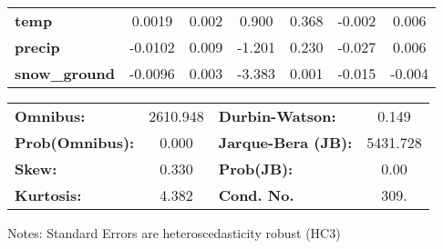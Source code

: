 \begin{center}
\begin{tabular}{lcccccc}
\textbf{temp}          &       0.0019  &        0.002     &     0.900  &         0.368        &       -0.002    &        0.006     \\
\textbf{precip}        &      -0.0102  &        0.009     &    -1.201  &         0.230        &       -0.027    &        0.006     \\
\textbf{snow\_ground}  &      -0.0096  &        0.003     &    -3.383  &         0.001        &       -0.015    &       -0.004     \\
\bottomrule
\end{tabular}
\begin{tabular}{lclc}
\textbf{Omnibus:}       & 2610.948 & \textbf{  Durbin-Watson:     } &    0.149  \\
\textbf{Prob(Omnibus):} &   0.000  & \textbf{  Jarque-Bera (JB):  } & 5431.728  \\
\textbf{Skew:}          &   0.330  & \textbf{  Prob(JB):          } &     0.00  \\
\textbf{Kurtosis:}      &   4.382  & \textbf{  Cond. No.          } &     309.  \\
\bottomrule
\end{tabular}
\end{center}

Notes: \newline
 [1] Standard Errors are heteroscedasticity robust (HC3)